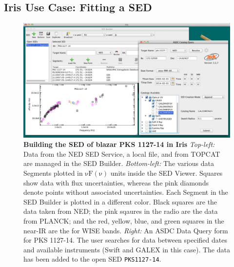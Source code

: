 \documentclass[5p]{elsarticle}
\begin{document}


%


\subsection{Iris Use Case: Fitting a SED}
\label{subsec:builtin}

\begin{figure}
\label{fig:load_data}
\begin{center}
\includegraphics[height=0.3\textheight]{figures/built-in-visuals-loading1.png}
\caption{\textbf{Building the SED of blazar PKS 1127-14 in Iris} \textit{Top-left:} Data from the NED SED Service, a local file, and from TOPCAT are managed in the SED Builder. \textit{Bottom-left:} The various data Segments plotted in $\mathrm{\nu F \left( \nu \right)}$ units inside the SED Viewer. Squares show data with flux uncertainties, whereas the pink diamonds denote points without associated uncertainties. Each Segment in the SED Builder is plotted in a different color. Black squares are the data taken from NED; the pink sqaures in the radio are the data from PLANCK; and the red, yellow, blue, and green squares in the near-IR are the for WISE bands. \textit{Right:} An ASDC Data Query form for PKS 1127-14. The user searches for data between specified dates and available instruments (Swift and GALEX in this case). The data has been added to the open SED \texttt{PKS1127-14}.}
\end{center}
\end{figure}
\end{document}

